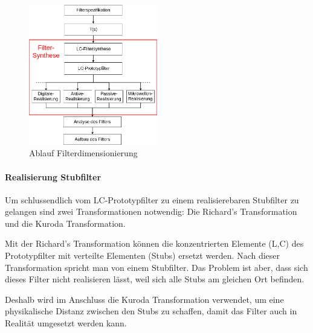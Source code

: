 \begin{figure}[h!]
\centering
 	\includegraphics[width=0.5\textwidth]{Ablauf_Filterdimensionierung_Allgemein.png}
 	\caption{Ablauf Filterdimensionierung}
 	\label{fig:Ablauf_Filterdimensionierung_Allgemein}
\end{figure}


\paragraph{Realisierung Stubfilter}

Um schlussendlich vom LC-Prototypfilter zu einem realisierebaren Stubfilter zu gelangen sind zwei Transformationen notwendig: Die Richard's Transformation und die Kuroda Transformation.

Mit der Richard's Transformation können die konzentrierten Elemente (L,C) des Prototypfilter mit verteilte Elementen (Stubs) ersetzt werden. Nach dieser Transformation spricht man von einem Stubfilter. Das Problem ist aber, dass sich dieses Filter nicht realisieren lässt, weil sich alle Stubs am gleichen Ort befinden. 

Deshalb wird im Anschluss die Kuroda Transformation verwendet,  um eine physikalische Distanz zwischen
den  Stubs  zu  schaffen, damit das Filter auch in Realit\"at umgesetzt  werden  kann.

